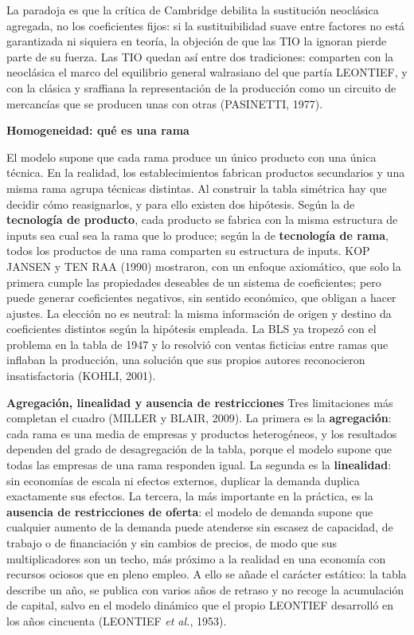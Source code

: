 \documentclass[10pt,a4paper]{article}
\begin{document}
La paradoja es que la crítica de Cambridge debilita la sustitución neoclásica agregada, no los coeficientes fijos: si la sustituibilidad suave entre factores no está garantizada ni siquiera en teoría, la objeción de que las TIO la ignoran pierde parte de su fuerza. Las TIO quedan así entre dos tradiciones: comparten con la neoclásica el marco del equilibrio general walrasiano del que partía LEONTIEF, y con la clásica y sraffiana la representación de la producción como un circuito de mercancías que se producen unas con otras (PASINETTI, 1977).

\textbf{Homogeneidad: qué es una rama}

El modelo supone que cada rama produce un único producto con una única técnica. En la realidad, los establecimientos fabrican productos secundarios y una misma rama agrupa técnicas distintas. Al construir la tabla simétrica hay que decidir cómo reasignarlos, y para ello existen dos hipótesis. Según la de \textbf{tecnología de producto}, cada producto se fabrica con la misma estructura de inputs sea cual sea la rama que lo produce; según la de \textbf{tecnología de rama}, todos los productos de una rama comparten su estructura de inputs. KOP JANSEN y TEN RAA (1990) mostraron, con un enfoque axiomático, que solo la primera cumple las propiedades deseables de un sistema de coeficientes; pero puede generar coeficientes negativos, sin sentido económico, que obligan a hacer ajustes. La elección no es neutral: la misma información de origen y destino da coeficientes distintos según la hipótesis empleada. La BLS ya tropezó con el problema en la tabla de 1947 y lo resolvió con ventas ficticias entre ramas que inflaban la producción, una solución que sus propios autores reconocieron insatisfactoria (KOHLI, 2001).

\textbf{Agregación, linealidad y ausencia de restricciones}
Tres limitaciones más completan el cuadro (MILLER y BLAIR, 2009). La primera es la \textbf{agregación}: cada rama es una media de empresas y productos heterogéneos, y los resultados dependen del grado de desagregación de la tabla, porque el modelo supone que todas las empresas de una rama responden igual. La segunda es la \textbf{linealidad}: sin economías de escala ni efectos externos, duplicar la demanda duplica exactamente sus efectos. La tercera, la más importante en la práctica, es la \textbf{ausencia de restricciones de oferta}: el modelo de demanda supone que cualquier aumento de la demanda puede atenderse sin escasez de capacidad, de trabajo o de financiación y sin cambios de precios, de modo que sus multiplicadores son un techo, más próximo a la realidad en una economía con recursos ociosos que en pleno empleo. A ello se añade el carácter estático: la tabla describe un año, se publica con varios años de retraso y no recoge la acumulación de capital, salvo en el modelo dinámico que el propio LEONTIEF desarrolló en los años cincuenta (LEONTIEF \textit{et al.}, 1953).
\end{document}
